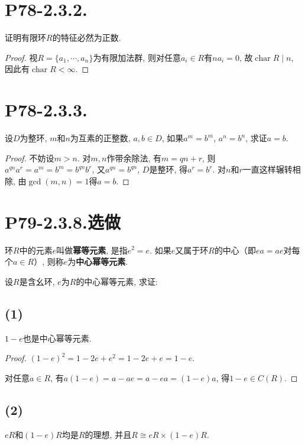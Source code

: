 \documentclass[12pt, a4paper, fontset=windows]{ctexart}
\newcommand{\ch}{\operatorname{char}}
\newcommand{\isom}{\cong} %
\newcommand{\kh}[1]{（{#1}）} %
\newcommand{\xuan}{{\normalsize 选做}}
\begin{document}
\section*{P78-2.3.2.}

证明有限环$R$的特征必然为正数. 

\begin{proof}
视$R=\{a_1,\cdots,a_n\}$为有限加法群, 则对任意$a_i\in R$有$na_i=0$, 
故$\ch R\mid n$, 因此有$\ch R<\infty$. 
\end{proof}

\section*{P78-2.3.3.}

设$D$为整环, $m$和$n$为互素的正整数, $a,b\in D$, 
如果$a^m=b^m$, $a^n=b^n$, 求证$a=b$. 

\begin{proof}
不妨设$m>n$. 对$m,n$作带余除法, 有$m=qn+r$, 则
$a^{qn}a^r=a^m=b^m=b^{qn}b^r$, 又$a^{qn}=b^{qn}$, 
$D$是整环, 得$a^r=b^r$. 对$n$和$r$一直这样辗转相除, 
由$\gcd(m,n)=1$得$a=b$. 
\end{proof}

\section*{P79-2.3.8.\xuan}

环$R$中的元素$e$叫做{\bf 幂等元素}, 是指$e^2=e$. 
如果$e$又属于环$R$的中心\kh{即$ea=ae$对每个$a\in R$}, 
则称$e$为{\bf 中心幂等元素}. 

设$R$是含幺环, $e$为$R$的中心幂等元素, 求证: 

\subsection*{(1)}

$1-e$也是中心幂等元素. 

\begin{proof}
$(1-e)^2=1-2e+e^2=1-2e+e=1-e$. 

对任意$a\in R$, 有$a(1-e)=a-ae=a-ea=(1-e)a$, 得$1-e\in C(R)$. 
\end{proof}

\subsection*{(2)}

$eR$和$(1-e)R$均是$R$的理想, 并且$R\isom eR\times(1-e)R$. 
\end{document}
